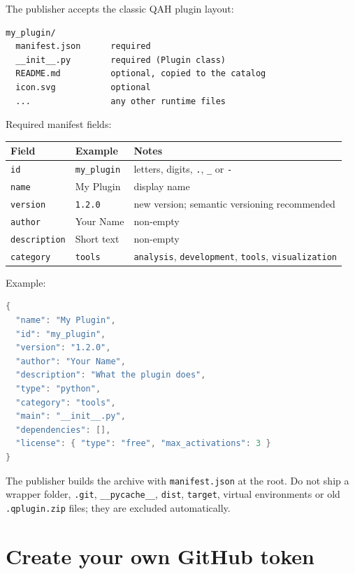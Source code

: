 \documentclass[11pt,a4paper]{article}
\newcommand{\code}[1]{\texttt{#1}}
\begin{document}
The publisher accepts the classic QAH plugin layout:

\begin{lstlisting}[caption={Minimal plugin folder}]
my_plugin/
  manifest.json      required
  __init__.py        required (Plugin class)
  README.md          optional, copied to the catalog
  icon.svg           optional
  ...                any other runtime files
\end{lstlisting}

Required manifest fields:

\begin{center}
\begin{tabular}{@{}llp{7.2cm}@{}}
\toprule
Field & Example & Notes \\
\midrule
\code{id} & \code{my\_plugin} & letters, digits, \code{.}, \code{\_} or \code{-} \\
\code{name} & My Plugin & display name \\
\code{version} & \code{1.2.0} & new version; semantic versioning recommended \\
\code{author} & Your Name & non-empty \\
\code{description} & Short text & non-empty \\
\code{category} & \code{tools} & \code{analysis}, \code{development}, \code{tools}, \code{visualization} \\
\bottomrule
\end{tabular}
\end{center}

Example:

\begin{lstlisting}[language=Java,caption={manifest.json}]
{
  "name": "My Plugin",
  "id": "my_plugin",
  "version": "1.2.0",
  "author": "Your Name",
  "description": "What the plugin does",
  "type": "python",
  "category": "tools",
  "main": "__init__.py",
  "dependencies": [],
  "license": { "type": "free", "max_activations": 3 }
}
\end{lstlisting}

The publisher builds the archive with \code{manifest.json} at the root. Do not
ship a wrapper folder, \code{.git}, \code{\_\_pycache\_\_}, \code{dist},
\code{target}, virtual environments or old \code{.qplugin.zip} files; they are
excluded automatically.

\section{Create your own GitHub token}\label{sec:token}
\end{document}
